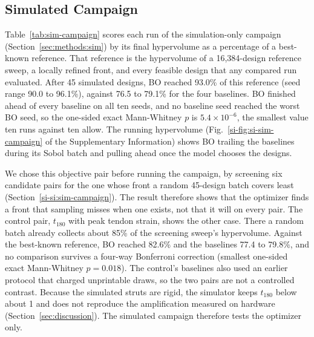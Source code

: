 \documentclass[lineno,nocopyright,upint,varvw,hyphenate]{asmejour}
\newcommand{\siref}[1]{\ref*{si-#1}}
\begin{document}
\subsection{Simulated Campaign}
\label{sec:results:sim}

Table~\ref{tab:sim-campaign} scores each run of the simulation-only
campaign (Section~\ref{sec:methods:sim}) by its final hypervolume as a
percentage of a best-known reference. That reference is the
hypervolume of a 16,384-design reference sweep, a locally refined
front, and every feasible design that any compared run evaluated. After 45 simulated
designs, BO reached 93.0\% of this reference (seed range 90.0 to
96.1\%), against 76.5 to 79.1\% for the four baselines. BO finished
ahead of every baseline on all ten seeds, and no baseline seed reached
the worst BO seed, so the one-sided exact Mann-Whitney $p$ is
$5.4\times10^{-6}$, the smallest value ten runs against ten allow. The
running hypervolume (Fig.~\siref{fig:si-sim-campaign} of the
Supplementary Information) shows BO trailing the baselines during its
Sobol batch and pulling ahead once the model chooses the designs.

We chose this objective pair before running the campaign, by screening
six candidate pairs for the one whose front a random 45-design batch
covers least (Section~\siref{si:sim-campaign}). The result therefore
shows that the optimizer finds a front that sampling misses when one
exists, not that it will on every pair. The control pair, $t_{180}$
with peak tendon strain, shows the other case. There a random batch
already collects about 85\% of the screening sweep's hypervolume.
Against the best-known reference, BO reached 82.6\% and the baselines
77.4 to 79.8\%, and no comparison survives a four-way
Bonferroni correction (smallest one-sided exact Mann-Whitney $p = 0.018$). The control's
baselines also used an earlier protocol that charged unprintable
draws, so the two pairs are not a controlled contrast. Because the
simulated struts are rigid, the simulator keeps $t_{180}$ below about 1
and does not reproduce the amplification measured on hardware
(Section~\ref{sec:discussion}). The simulated campaign therefore tests
the optimizer only.

\begin{table}[t]
  \centering
  \caption{Simulation-only campaign: final hypervolume after 45
    designs as a percentage of each objective pair's best-known
    reference (mean $\pm$ sample standard deviation over ten seeds).
    $p$ is the $p$-value of the one-sided exact Mann-Whitney test that BO exceeds the
    baseline, and Wins counts the seeds on which BO finished ahead of
    the baseline run with the same seed index. LHS is Latin hypercube
    sampling. The envelope-pair baselines skip unprintable candidates
    without simulating them, and the strain control used the earlier
    protocol that charged them.}%
  \label{tab:sim-campaign}
  \footnotesize
  \setlength{\tabcolsep}{3.5pt}
  
\end{table}
\end{document}
